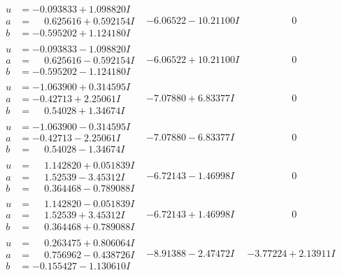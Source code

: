 \documentclass[1p]{elsarticle_modified}
\theoremstyle{definition}
\begin{document}
$$\begin{array}{c|c|c}
\begin{aligned}
u &= -0.093833 + 1.098820 I \\
a &= \phantom{-}0.625616 + 0.592154 I \\
b &= -0.595202 + 1.124180 I\end{aligned}
 & -6.06522 - 10.21100 I & \phantom{-0.000000 } 0 \\ \hline\begin{aligned}
u &= -0.093833 - 1.098820 I \\
a &= \phantom{-}0.625616 - 0.592154 I \\
b &= -0.595202 - 1.124180 I\end{aligned}
 & -6.06522 + 10.21100 I & \phantom{-0.000000 } 0 \\ \hline\begin{aligned}
u &= -1.063900 + 0.314595 I \\
a &= -0.42713 + 2.25061 I \\
b &= \phantom{-}0.54028 + 1.34674 I\end{aligned}
 & -7.07880 + 6.83377 I & \phantom{-0.000000 } 0 \\ \hline\begin{aligned}
u &= -1.063900 - 0.314595 I \\
a &= -0.42713 - 2.25061 I \\
b &= \phantom{-}0.54028 - 1.34674 I\end{aligned}
 & -7.07880 - 6.83377 I & \phantom{-0.000000 } 0 \\ \hline\begin{aligned}
u &= \phantom{-}1.142820 + 0.051839 I \\
a &= \phantom{-}1.52539 - 3.45312 I \\
b &= \phantom{-}0.364468 - 0.789088 I\end{aligned}
 & -6.72143 - 1.46998 I & \phantom{-0.000000 } 0 \\ \hline\begin{aligned}
u &= \phantom{-}1.142820 - 0.051839 I \\
a &= \phantom{-}1.52539 + 3.45312 I \\
b &= \phantom{-}0.364468 + 0.789088 I\end{aligned}
 & -6.72143 + 1.46998 I & \phantom{-0.000000 } 0 \\ \hline\begin{aligned}
u &= \phantom{-}0.263475 + 0.806064 I \\
a &= \phantom{-}0.756962 - 0.438726 I \\
b &= -0.155427 - 1.130610 I\end{aligned}
 & -8.91388 - 2.47472 I & -3.77224 + 2.13911 I \\ \hline\begin{aligned}

\end{aligned}
\end{array}$$
\end{document}
